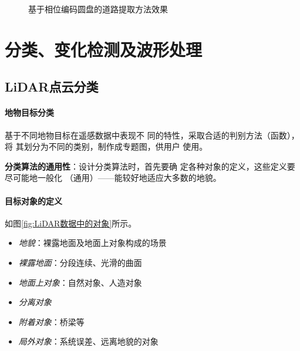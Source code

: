 \begin{figure}
	 \hfill
	\caption{基于相位编码圆盘的道路提取方法效果}
	\label{fig:基于相位编码圆盘的道路提取方法效果}
\end{figure}


\section{分类、变化检测及波形处理}

\subsection{LiDAR点云分类}

\paragraph{地物目标分类}基于不同地物目标在遥感数据中表现不
同的特性，采取合适的判别方法（函数），将
其划分为不同的类别，制作成专题图，供用户
使用。

\textbf{分类算法的通用性}：设计分类算法时，首先要确
定各种对象的定义，这些定义要尽可能地一般化
（通用）——能较好地适应大多数的地貌。

\paragraph{目标对象的定义}如图\ref{fig:LiDAR数据中的对象}所示。
\begin{itemize}
	\item \textit{地貌}：裸露地面及地面上对象构成的场景
	\item \textit{裸露地面}：分段连续、光滑的曲面
	\item \textit{地面上对象}：自然对象、人造对象
	\item \textit{分离对象}
	\item \textit{附着对象}：桥梁等
	\item \textit{局外对象}：系统误差、远离地貌的对象
\end{itemize}


